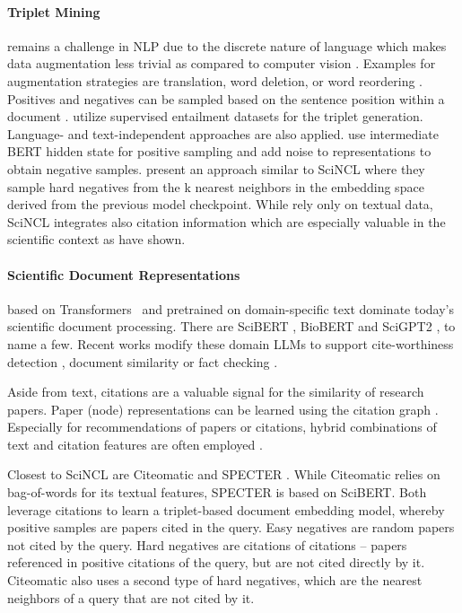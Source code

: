\documentclass[11pt]{article}
\newcommand{\sys}{SciNCL\xspace} \newcommand{\baselineCount}{10\xspace}
\begin{document}
\paragraph{Triplet Mining} remains a challenge in NLP due to the discrete nature of language which makes data augmentation less trivial as compared to computer vision \cite{Gao2021}.
Examples for augmentation strategies are translation, word deletion, or word reordering \cite{Fang2020,Wu2020}.
Positives and negatives can be sampled based on the sentence position within a document \cite{Giorgi2021}.
\citet{Gao2021} utilize supervised entailment datasets for the triplet generation.
Language- and text-independent approaches are also applied.
\citet{Kim2021} use intermediate BERT hidden state for positive sampling and \citet{Wu2021} add noise to representations to obtain negative samples.
\citet{Xiong2020} present an approach similar to \sys where they sample hard negatives from the k nearest neighbors in the embedding space derived from the previous model checkpoint.
While \citeauthor{Xiong2020} rely only on textual data, 
\sys integrates also citation information which are especially valuable in the scientific context as \citet{Cohan2020} have shown.


\paragraph{Scientific Document Representations}
based on Transformers~\cite{Vaswani2017} and pretrained on domain-specific text dominate today's scientific document processing.
There are SciBERT \cite{Beltagy2019}, BioBERT \cite{Lee2019} and SciGPT2 \cite{Luu2021}, to name a few. Recent works modify these domain LLMs to support cite-worthiness detection \cite{wright2021citeworth}, document similarity \cite{Ostendorff2020c}
or fact checking \cite{Wadden2020}.

Aside from text, citations are a valuable signal for the similarity of research papers.
Paper (node) representations can be learned using the citation graph \cite{Wu2019,Perozzi2014,Grover2016}.
Especially for recommendations of papers or citations, hybrid combinations of text and citation features are often employed \cite{Han2018,Jeong2020ACC,Brochier2019,Yang2015,holm2022longitudinal}.

Closest to \sys are Citeomatic \cite{Bhagavatula2018} and SPECTER \cite{Cohan2020}.
While Citeomatic relies on bag-of-words for its textual features, SPECTER is based on SciBERT.
Both leverage citations to learn a triplet-based document embedding model, whereby positive samples are papers cited in the query.
Easy negatives are random papers not cited by the query.
Hard negatives are citations of citations -- papers referenced in positive citations of the query, but are not cited directly by it.
Citeomatic also uses a second type of hard negatives, which are the nearest neighbors of a query  that are not cited by it.
\end{document}
